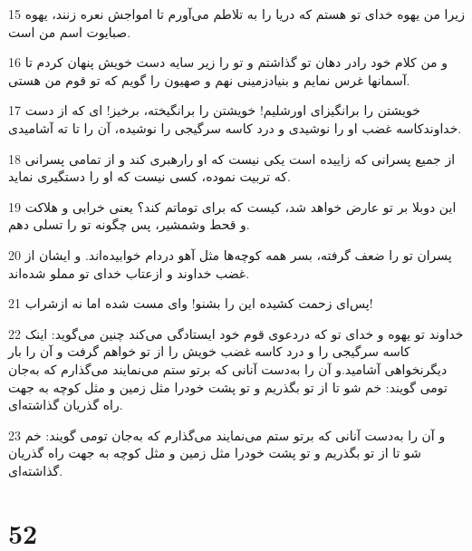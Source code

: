 \par 15 زیرا من یهوه خدای تو هستم که دریا را به تلاطم می‌آورم تا امواجش نعره زنند، یهوه صبایوت اسم من است.
\par 16 و من کلام خود رادر دهان تو گذاشتم و تو را زیر سایه دست خویش پنهان کردم تا آسمانها غرس نمایم و بنیادزمینی نهم و صهیون را گویم که تو قوم من هستی.
\par 17 خویشتن را برانگیز‌ای اورشلیم! خویشتن را برانگیخته، برخیز! ای که از دست خداوندکاسه غضب او را نوشیدی و درد کاسه سرگیجی را نوشیده، آن را تا ته آشامیدی.
\par 18 از جمیع پسرانی که زاییده است یکی نیست که او رارهبری کند و از تمامی پسرانی که تربیت نموده، کسی نیست که او را دستگیری نماید.
\par 19 این دوبلا بر تو عارض خواهد شد، کیست که برای توماتم کند؟ یعنی خرابی و هلاکت و قحط وشمشیر، پس چگونه تو را تسلی دهم.
\par 20 پسران تو را ضعف گرفته، بسر همه کوچه‌ها مثل آهو دردام خوابیده‌اند. و ایشان از غضب خداوند و ازعتاب خدای تو مملو شده‌اند.
\par 21 پس‌ای زحمت کشیده این را بشنو! و‌ای مست شده اما نه ازشراب!
\par 22 خداوند تو یهوه و خدای تو که دردعوی قوم خود ایستادگی می‌کند چنین می‌گوید: اینک کاسه سرگیجی را و درد کاسه غضب خویش را از تو خواهم گرفت و آن را بار دیگرنخواهی آشامید.و آن را به‌دست آنانی که برتو ستم می‌نمایند می‌گذارم که به‌جان تومی گویند: خم شو تا از تو بگذریم و تو پشت خودرا مثل زمین و مثل کوچه به جهت راه گذریان گذاشته‌ای.
\par 23 و آن را به‌دست آنانی که برتو ستم می‌نمایند می‌گذارم که به‌جان تومی گویند: خم شو تا از تو بگذریم و تو پشت خودرا مثل زمین و مثل کوچه به جهت راه گذریان گذاشته‌ای.
 
\chapter{52}

